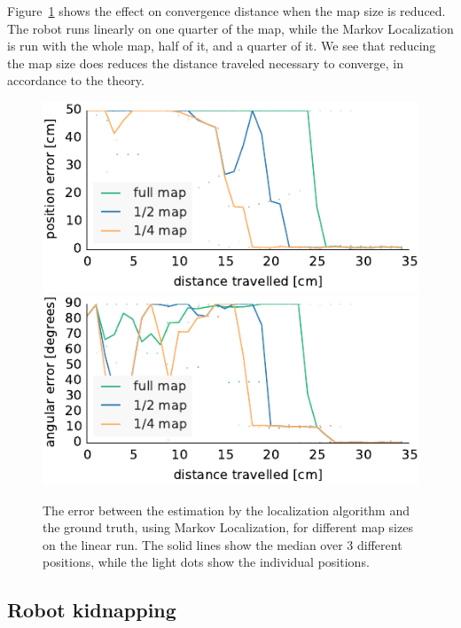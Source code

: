 \documentclass[letterpaper, 10pt, conference]{ieeeconf}
\newcommand{\Fig}[1]{Figure~\ref{fig:#1}}
\begin{document}
\Fig{small-maps} shows the effect on convergence distance when the map size is reduced.
The robot runs linearly on one quarter of the map, while the Markov Localization is run with the whole map, half of it, and a quarter of it.
We see that reducing the map size does reduces the distance traveled necessary to converge, in accordance to the theory.

\begin{figure}
\includegraphics{ml-small_maps-xy}
\vspace{.5em}
\includegraphics{ml-small_maps-theta}
\caption{The error between the estimation by the localization algorithm and the ground truth, using Markov Localization, for different map sizes on the linear run.
The solid lines show the median over 3 different positions, while the light dots show the individual positions.}
\label{fig:small-maps}
\end{figure}

\subsection{Robot kidnapping}
\end{document}
